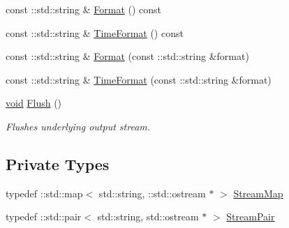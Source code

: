 \begin{DoxyCompactItemize}
\item 
const \+::std\+::string \& \mbox{\hyperlink{classeasylogger_1_1_logger_a5289aa36c7ae745fa960af5b59a6ed54}{Format}} () const
\item 
const \+::std\+::string \& \mbox{\hyperlink{classeasylogger_1_1_logger_ae4f6966ba512d06584b83118909a2f73}{Time\+Format}} () const
\item 
const \+::std\+::string \& \mbox{\hyperlink{classeasylogger_1_1_logger_ab9395d1199d0ef5539f14552834d42a7}{Format}} (const \+::std\+::string \&format)
\item 
const \+::std\+::string \& \mbox{\hyperlink{classeasylogger_1_1_logger_a0b0ff3f703f2e6c04e86e8877d5a906c}{Time\+Format}} (const \+::std\+::string \&format)
\item 
\mbox{\hyperlink{_thread_8h_af1e856da2e658414cb2456cb6f7ebc66}{void}} \mbox{\hyperlink{classeasylogger_1_1_logger_ae5f1bdb76764e5cb673d27bead3f84b0}{Flush}} ()
\begin{DoxyCompactList}\small\item\em Flushes underlying output stream. \end{DoxyCompactList}\end{DoxyCompactItemize}
\subsection*{Private Types}
\begin{DoxyCompactItemize}
\item 
typedef \+::std\+::map$<$ std\+::string, \+::std\+::ostream $\ast$ $>$ \mbox{\hyperlink{classeasylogger_1_1_logger_a27625e597ce11062ffd04fc8ca5154cd}{Stream\+Map}}
\item 
typedef \+::std\+::pair$<$ std\+::string, std\+::ostream $\ast$ $>$ \mbox{\hyperlink{classeasylogger_1_1_logger_a8c37cd26d5210c8ede4cd355a6bceb95}{Stream\+Pair}}
\end{DoxyCompactItemize}
